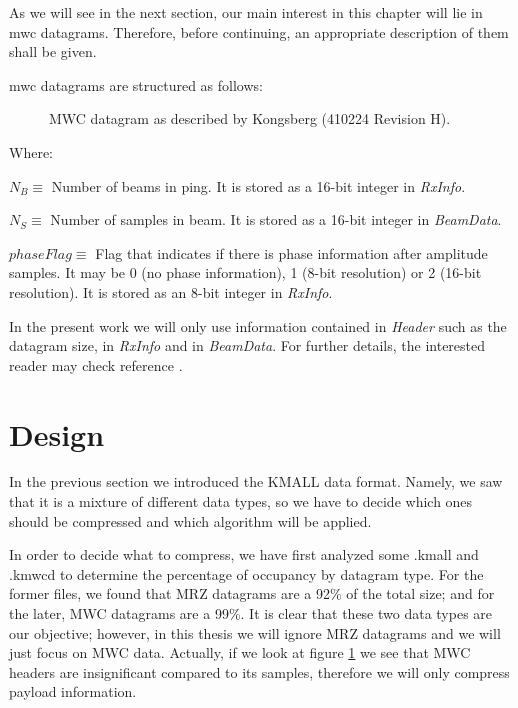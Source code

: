 As we will see in the next section, our main interest in this chapter will lie in \acrshort{mwc} datagrams. Therefore, before continuing, an appropriate description of them shall be given.

\pagebreak
\acrshort{mwc} datagrams are structured as follows:

\begin{figure}[h!]
	\begin{center}
		\scalebox{.565}{}
	\end{center}
	\caption{MWC datagram as described by Kongsberg (410224 Revision H).}
	\label{fig:mwc_datagram}
\end{figure}
Where:
\begin{description}
	\item $N_B \equiv$ Number of beams in ping. It is stored as a 16-bit integer in \textit{RxInfo}.
	\item $N_S \equiv$ Number of samples in beam. It is stored as a 16-bit integer in \textit{BeamData}.
	\item $phaseFlag \equiv$ Flag that indicates if there is phase information after amplitude samples. It may be 0 (no phase information), 1 (8-bit resolution) or 2 (16-bit resolution). It is stored as an 8-bit integer in \textit{RxInfo}.
\end{description}

In the present work we will only use information contained in \textit{Header} such as the datagram size, in \textit{RxInfo} and in \textit{BeamData}. For further details, the interested reader may check reference \parencite{KMALL}.

\section{Design}

In the previous section we introduced the KMALL data format. Namely, we saw that it is a mixture of different data types, so we have to decide which ones should be compressed and which algorithm will be applied.

In order to decide what to compress, we have first analyzed some .kmall and .kmwcd to determine the percentage of occupancy by datagram type. For the former files, we found that MRZ datagrams are a 92\% of the total size; and for the later, MWC datagrams are a 99\%. It is clear that these two data types are our objective; however, in this thesis we will ignore MRZ datagrams and we will just focus on MWC data. Actually, if we look at figure \ref{fig:mwc_datagram} we see that MWC headers are insignificant compared to its samples, therefore we will only compress payload information.

